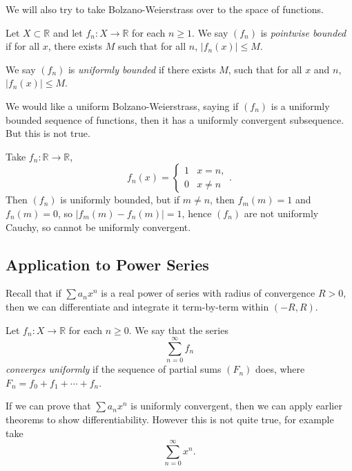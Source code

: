 \documentclass[12pt]{article}
\begin{document}
We will also try to take Bolzano-Weierstrass over to the space of functions.

\begin{definition}
	Let $X \subset \mathbb{R}$ and let $f_n : X \to \mathbb{R}$ for each $n \geq 1$. We say $(f_n)$ is \textit{pointwise bounded} if for all $x$, there exists $M$ such that for all $n$, $|f_n(x)| \leq M$.

	We say $(f_n)$ is \textit{uniformly bounded} if there exists $M$, such that for all $x$ and $n$, $|f_n(x)| \leq M$.
\end{definition}

We would like a uniform Bolzano-Weierstrass, saying if $(f_n)$ is a uniformly bounded sequence of functions, then it has a uniformly convergent subsequence. But this is not true.

\begin{exbox}
	Take $f_n : \mathbb{R} \to \mathbb{R}$, 
	\[
		f_n(x) =
		\begin{cases}
			1 & x = n,\\
			0 & x \neq n
		\end{cases}
	.\]
	Then $(f_n)$ is uniformly bounded, but if $m \neq n$, then $f_m(m) = 1$ and $f_n(m) = 0$, so $|f_m(m) - f_n(m)| = 1$, hence $(f_n)$ are not uniformly Cauchy, so cannot be uniformly convergent.
\end{exbox}

\subsection{Application to Power Series}%
\label{sub:application_to_power_series}

Recall that if $\sum a_n x^{n}$ is a real power of series with radius of convergence $R > 0$, then we can differentiate and integrate it term-by-term within $(-R, R)$.

\begin{definition}
	Let $f_n : X \to \mathbb{R}$ for each $n \geq 0$. We say that the series
	\[
	\sum_{n = 0}^{\infty}f_n
	\]
	\textit{converges uniformly} if the sequence of partial sums $(F_n)$ does, where $F_n = f_0 + f_1 + \cdots + f_n$.
\end{definition}

If we can prove that $\sum a_n x^{n}$ is uniformly convergent, then we can apply earlier theorems to show differentiability. However this is not quite true, for example take
\[
\sum_{n = 0}^{\infty} x^{n}
.\]
\end{document}
